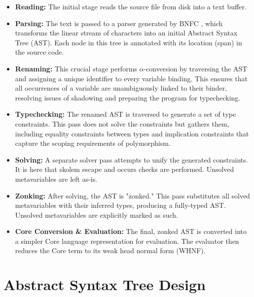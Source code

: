 \begin{itemize}
    \item \textbf{Reading:} The initial stage reads the source file from disk into a text buffer.
    \item \textbf{Parsing:} The text is passed to a parser generated by BNFC \cite{bnfc-site-2025}, which transforms the linear stream of characters into an initial Abstract Syntax Tree (AST). Each node in this tree is annotated with its location (span) in the source code.
    \item \textbf{Renaming:} This crucial stage performs $\alpha$-conversion by traversing the AST and assigning a unique identifier to every variable binding. This ensures that all occurrences of a variable are unambiguously linked to their binder, resolving issues of shadowing and preparing the program for typechecking.
    \item \textbf{Typechecking:} The renamed AST is traversed to generate a set of type constraints. This pass does not solve the constraints but gathers them, including equality constraints between types and implication constraints that capture the scoping requirements of polymorphism.
    \item \textbf{Solving:} A separate solver pass attempts to unify the generated constraints. It is here that skolem escape and occurs checks are performed. Unsolved metavariables are left as-is.
    \item \textbf{Zonking:} After solving, the AST is "zonked." This pass substitutes all solved metavariables with their inferred types, producing a fully-typed AST. Unsolved metavariables are explicitly marked as such.
    \item \textbf{Core Conversion \& Evaluation:} The final, zonked AST is converted into a simpler Core language representation for evaluation. The evaluator then reduces the Core term to its weak head normal form (WHNF).
\end{itemize}

\section{Abstract Syntax Tree Design}
\label{sec:Design:AST}

